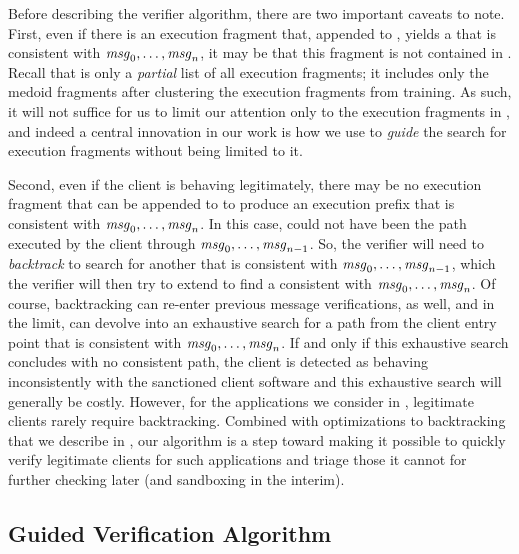 Before describing the verifier algorithm, there are two important
caveats to note.  First, even if there is an execution fragment that,
appended to , yields a \execPrefix{\msgNmbr}
that is consistent with $\mathit{msg}_{0}, \ldots, \mathit{msg}_{n}$, it may be
that this fragment is not contained in \trainingFrags{}.  Recall that
\trainingFrags{} is only a \textit{partial} list of all execution
fragments; it includes only the medoid fragments after clustering the
execution fragments from training.  As such, it will not suffice for
us to limit our attention only to the execution fragments in
\trainingFrags{}, and indeed a central innovation in our work is how
we use \trainingFrags{} to \textit{guide} the search for execution
fragments without being limited to it.

Second, even if the client is behaving legitimately,
there may be no execution fragment that can be appended to
 to produce an execution prefix
\execPrefix{\msgNmbr} that is consistent with $\mathit{msg}_{0}, \ldots,
\mathit{msg}_{n}$.  In this case,  could not have
been the path executed by the client through $\mathit{msg}_{0}, \ldots,
\mathit{msg}_{n-1}$.  So, the verifier will need to \textit{backtrack}
to search for another  that is consistent
with $\mathit{msg}_{0}, \ldots, \mathit{msg}_{n-1}$, which the verifier will then
try to extend to find a \execPrefix{\msgNmbr} consistent with
$\mathit{msg}_{0}, \ldots, \mathit{msg}_{n}$.  Of course, backtracking can
re-enter previous message verifications, as well, and in the limit, can devolve
into an exhaustive search for a path from the client entry point that
is consistent with $\mathit{msg}_{0}, \ldots, \mathit{msg}_{n}$.  If and only if
this exhaustive search concludes with no consistent path, the client
is detected as behaving inconsistently with the sanctioned client
software
and this exhaustive search
will generally be costly.  However, for the
applications we consider in , legitimate clients
rarely require backtracking.  Combined with optimizations to
backtracking that we describe in
, our algorithm is a step toward
making it possible to quickly verify legitimate clients for such
applications and triage those it cannot for further checking later
(and sandboxing in the interim).

\subsection{Guided Verification Algorithm}
\label{sec:guided:verification:basic}

